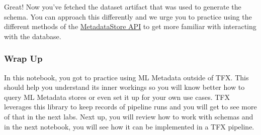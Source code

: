 \documentclass[11pt]{article}
\begin{document}
    Great! Now you've fetched the dataset artifact that was used to generate
the schema. You can approach this differently and we urge you to
practice using the different methods of the
\href{https://www.tensorflow.org/tfx/ml_metadata/api_docs/python/mlmd/MetadataStore}{MetadataStore
API} to get more familiar with interacting with the database.

    \hypertarget{wrap-up}{%
\subsubsection{Wrap Up}\label{wrap-up}}

In this notebook, you got to practice using ML Metadata outside of TFX.
This should help you understand its inner workings so you will know
better how to query ML Metadata stores or even set it up for your own
use cases. TFX leverages this library to keep records of pipeline runs
and you will get to see more of that in the next labs. Next up, you will
review how to work with schemas and in the next notebook, you will see
how it can be implemented in a TFX pipeline.


    
    
    
\end{document}
